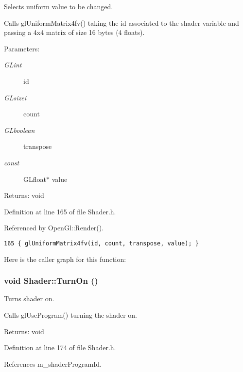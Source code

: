 Selects uniform value to be changed. 

Calls glUniformMatrix4fv() taking the id associated to the shader variable and passing a 4x4 matrix of size 16 bytes (4 floats).

\begin{Desc}
\item[Parameters:]
\begin{description}
\item[{\em GLint}]id \item[{\em GLsizei}]count \item[{\em GLboolean}]transpose \item[{\em const}]GLfloat$\ast$ value \end{description}
\end{Desc}
\begin{Desc}
\item[Returns:]void \end{Desc}


Definition at line 165 of file Shader.h.

Referenced by OpenGl::Render().

\begin{Code}\begin{verbatim}165 { glUniformMatrix4fv(id, count, transpose, value); }
\end{verbatim}
\end{Code}




Here is the caller graph for this function:\hypertarget{class_shader_01e9b0696a56a5c567ea4b369872c982}{
\subsubsection[TurnOn]{\setlength{\rightskip}{0pt plus 5cm}void Shader::TurnOn ()}}
\label{class_shader_01e9b0696a56a5c567ea4b369872c982}


Turns shader on. 

Calls glUseProgram() turning the shader on.

\begin{Desc}
\item[Returns:]void \end{Desc}


Definition at line 174 of file Shader.h.

References m\_\-shaderProgramId.

